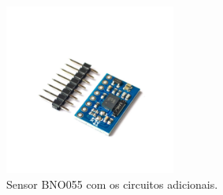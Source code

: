 

\begin{figure}[ht]
    \centering
    \caption{Sensor BNO055 com os circuitos adicionais.}
    \begin{center}
        \includegraphics[width=0.50\textwidth]{img/Sensor BNO055.jpg}
    \end{center}
    \vspace{-0.5cm}
    \label{fig:BNO055}
\end{figure}